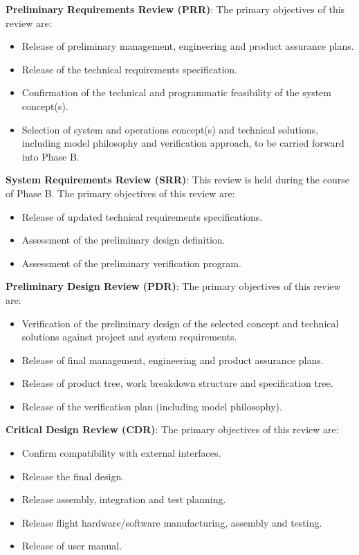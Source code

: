 \textbf{Preliminary Requirements Review (PRR)}: The primary objectives of this review are:
\begin{itemize}
\item Release of preliminary management, engineering and product assurance plans.
\item Release of the technical requirements specification.
\item Confirmation of the technical and programmatic feasibility of the system concept(s).
\item Selection of system and operations concept(s) and technical solutions, including model philosophy and verification approach, to be carried forward into Phase B.
\end{itemize}

\textbf{System Requirements Review (SRR)}: This review is held during the course of Phase B. The primary objectives of this review are:
\begin{itemize}
\item Release of updated technical requirements specifications.
\item Assessment of the preliminary design definition.
\item Assessment of the preliminary verification program.
\end{itemize}

\textbf{Preliminary Design Review (PDR)}: The primary objectives of this review are:
\begin{itemize}
\item Verification of the preliminary design of the selected concept and technical solutions against project and system requirements.
\item Release of final management, engineering and product assurance plans.
\item Release of product tree, work breakdown structure and specification tree.
\item Release of the verification plan (including model philosophy).
\end{itemize}

\textbf{Critical Design Review (CDR)}: The primary objectives of this review are:
\begin{itemize}
\item Confirm compatibility with external interfaces.
\item Release the final design.
\item Release assembly, integration and test planning.
\item Release flight hardware/software manufacturing, assembly and testing.
\item Release of user manual.
\end{itemize}

